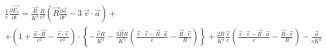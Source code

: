 \documentclass[11pt]{article}
\makeatletter
\newcommand{\boxspacing}{\kern\kvtcb@left@rule\kern\kvtcb@boxsep}
\newcommand{\prompt}[4]{
        {\ttfamily\llap{{\color{#2}[#3]:\hspace{3pt}#4}}\vspace{-\baselineskip}}
    }
\makeatother
\begin{document}
\[\begin{align}
  & \frac{1}{e}\frac{\partial \overrightarrow{{{E}_{1}}}}{\partial t}=\frac{\overrightarrow{R}}{{{K}^{4}}}\frac{R}{{{c}^{2}}}\left( \overrightarrow{R}\frac{\partial \overrightarrow{a}}{\partial t'}-3\ \overrightarrow{v}\cdot \overrightarrow{a} \right)+ \\ 
 & +\left( 1+\frac{\overrightarrow{a}\cdot \overrightarrow{R}}{{{c}^{2}}}-\frac{\overrightarrow{v}\cdot \overrightarrow{v}}{{{c}^{2}}} \right)\cdot \left\{ -\frac{\overrightarrow{v}R}{{{K}^{4}}}-\frac{3\overrightarrow{R}R}{{{K}^{5}}}\left( \frac{\overrightarrow{v}\cdot \overrightarrow{v}-\overrightarrow{R}\cdot \overrightarrow{a}}{c}-\frac{\overrightarrow{R}\cdot \overrightarrow{v}}{R} \right) \right\}+\frac{2R}{{{K}^{4}}}\frac{\overrightarrow{v}}{c}\left( \frac{\overrightarrow{v}\cdot \overrightarrow{v}-\overrightarrow{R}\cdot \overrightarrow{a}}{c}-\frac{\overrightarrow{R}\cdot \overrightarrow{v}}{R} \right)-\frac{\overrightarrow{a}}{c{{K}^{2}}} \\ 
\end{align}\]

    \begin{tcolorbox}[breakable, size=fbox, boxrule=1pt, pad at break*=1mm,colback=cellbackground, colframe=cellborder]
\prompt{In}{incolor}{ }{\boxspacing}
\begin{Verbatim}[commandchars=\\\{\}]

\end{Verbatim}
\end{tcolorbox}


    
    
    
\end{document}
